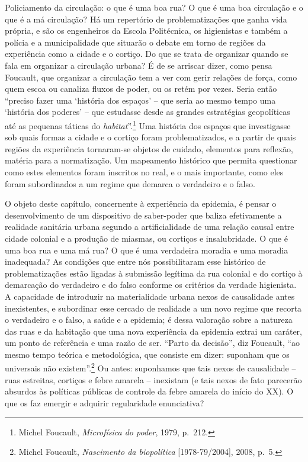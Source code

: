 Policiamento da circulação: o que é uma boa rua? O que é uma boa
circulação e o que é a má circulação? Há um repertório de
problematizações que ganha vida própria, e são os engenheiros da Escola
Politécnica, os higienistas e também a polícia e a municipalidade que
situarão o debate em torno de regiões da experiência como a cidade e o
cortiço. Do que se trata de organizar quando se fala em organizar a
circulação urbana? É de se arriscar dizer, como pensa Foucault, que
organizar a circulação tem a ver com gerir relações de força, como quem
escoa ou canaliza fluxos de poder, ou os retém por vezes. Seria então
``preciso fazer uma `história dos espaços' -- que seria ao mesmo tempo
uma `história dos poderes' -- que estudasse desde as grandes estratégias
geopolíticas até as pequenas táticas do \emph{habitat}''.\footnote{Michel
  Foucault, \emph{Microfísica do poder}, 1979, p.~212.} Uma história dos
espaços que investigasse sob quais formas a cidade e o cortiço foram
problematizados, e a partir de quais regiões da experiência tornaram-se
objetos de cuidado, elementos para reflexão, matéria para a
normatização. Um mapeamento histórico que permita questionar como estes
elementos foram inscritos no real, e o mais importante, como eles foram
subordinados a um regime que demarca o verdadeiro e o falso.

O objeto deste capítulo, concernente à experiência da epidemia, é pensar
o desenvolvimento de um dispositivo de saber-poder que baliza
efetivamente a realidade sanitária urbana segundo a artificialidade de
uma relação causal entre cidade colonial e a produção de miasmas, ou
cortiços e insalubridade. O que é uma boa rua e uma má rua? O que é uma
verdadeira moradia e uma moradia inadequada? As condições que entre nós
possibilitaram esse histórico de problematizações estão ligadas à
submissão legítima da rua colonial e do cortiço à demarcação do
verdadeiro e do falso conforme os critérios da verdade higienista. A
capacidade de introduzir na materialidade urbana nexos de causalidade
antes inexistentes, e subordinar esse cercado de realidade a um novo
regime que recorta o verdadeiro e o falso, a saúde e a epidemia; é dessa
valoração sobre a natureza das ruas e da habitação que uma nova
experiência da epidemia extrai um caráter, um ponto de referência e uma
razão de ser. ``Parto da decisão'', diz Foucault, ``ao mesmo tempo
teórica e metodológica, que consiste em dizer: suponham que os
universais não existem''.\footnote{Michel Foucault, \emph{Nascimento da
  biopolítica} {[}1978-79/2004{]}, 2008, p.~5.} Ou antes: suponhamos que
tais nexos de causalidade -- ruas estreitas, cortiços e febre amarela --
inexistam (e tais nexos de fato parecerão absurdos às políticas públicas
de controle da febre amarela do início do XX). O que os faz emergir e
adquirir regularidade enunciativa?

